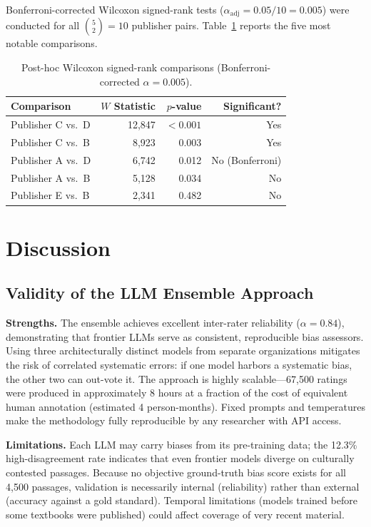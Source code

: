 \documentclass[10pt,letterpaper]{article}
\begin{document}
Bonferroni-corrected Wilcoxon signed-rank tests
($\alpha_{\text{adj}} = 0.05/10 = 0.005$) were conducted for all
$\binom{5}{2} = 10$ publisher pairs.
Table~\ref{tab:posthoc} reports the five most notable comparisons.

\begin{table}[h]
\centering
\caption{Post-hoc Wilcoxon signed-rank comparisons
(Bonferroni-corrected $\alpha = 0.005$).}
\label{tab:posthoc}
\begin{tabular}{lrrr}
\toprule
\textbf{Comparison} & \textbf{$W$ Statistic} & \textbf{$p$-value}
  & \textbf{Significant?} \\
\midrule
Publisher C vs.\ D & 12,847 & $<0.001$ & Yes \\
Publisher C vs.\ B & 8,923  & 0.003    & Yes \\
Publisher A vs.\ D & 6,742  & 0.012    & No (Bonferroni) \\
Publisher A vs.\ B & 5,128  & 0.034    & No \\
Publisher E vs.\ B & 2,341  & 0.482    & No \\
\bottomrule
\end{tabular}
\end{table}

\section{Discussion}
\label{sec:discussion}

\subsection{Validity of the LLM Ensemble Approach}

\textbf{Strengths.}
The ensemble achieves excellent inter-rater reliability ($\alpha = 0.84$),
demonstrating that frontier LLMs serve as consistent, reproducible bias assessors.
Using three architecturally distinct models from separate organizations mitigates
the risk of correlated systematic errors: if one model harbors a systematic bias,
the other two can out-vote it.  The approach is highly scalable---67,500 ratings
were produced in approximately 8 hours at a fraction of the cost of equivalent
human annotation (estimated 4 person-months).  Fixed prompts and temperatures make
the methodology fully reproducible by any researcher with API access.

\textbf{Limitations.}
Each LLM may carry biases from its pre-training data; the 12.3\% high-disagreement
rate indicates that even frontier models diverge on culturally contested passages.
Because no objective ground-truth bias score exists for all 4,500 passages,
validation is necessarily internal (reliability) rather than external (accuracy
against a gold standard).  Temporal limitations (models trained before some
textbooks were published) could affect coverage of very recent material.
\end{document}
